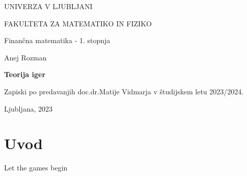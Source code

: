\documentclass[a4paper,12pt]{article}
\begin{document}
\begin{titlepage}
    UNIVERZA V LJUBLJANI
  
    FAKULTETA ZA MATEMATIKO IN FIZIKO
  
    \vspace{0.5cm}
    Finančna matematika - 1. stopnja
  
    \begin{center}
        \vspace{7cm}
            Anej Rozman
  
        \vspace{0.4cm}
        \textbf{\Large{Teorija iger}}
        \vspace{0.3cm}
  
        Zapiski po predavanjih doc.\@ dr.\@ Matije Vidmarja v študijskem letu 2023/2024.
    \end{center}
    \vfill
        Ljubljana, 2023     
    \thispagestyle{empty}
\end{titlepage}

\newpage
  
\tableofcontents
   
\newpage
    
\section*{Uvod}
Let the games begin
\end{document}
